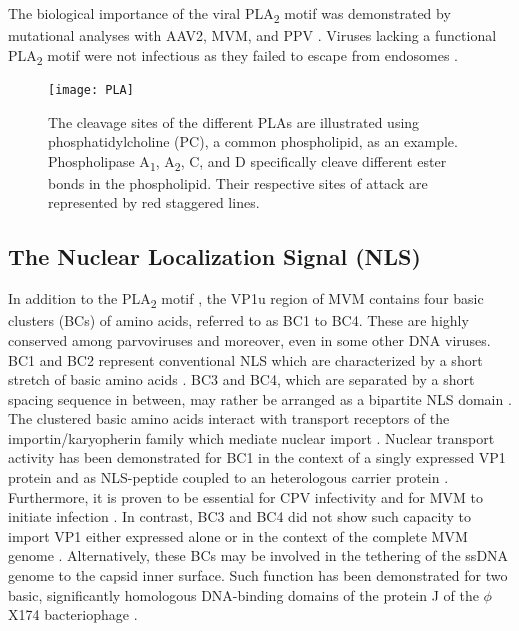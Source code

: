 The biological importance of the viral PLA\textsubscript{2} motif was demonstrated by mutational analyses with AAV2, MVM, and PPV \cite{pmid16284249, pmid11702787, pmid20974479}. Viruses lacking a functional PLA\textsubscript{2} motif were not infectious as they failed to escape from endosomes \cite{pmid16284249, pmid14644609,  pmid11799199, pmid11961250}.               

\begin{figure}[H]
\centering
  \texttt{[image: PLA]}
  \caption[The Cleavage Sites of Different Types of PLAs]
   {The cleavage sites of the different PLAs are illustrated using phosphatidylcholine (PC), a common phospholipid, as an example. Phospholipase A\textsubscript{1}, A\textsubscript{2}, C, and D specifically cleave different ester bonds in the phospholipid. Their respective sites of attack are represented by red staggered lines.} 
\label{PLA}
\end{figure}

\subsection{The Nuclear Localization Signal (NLS)}
\label{NLS1}
In addition to the PLA\textsubscript{2} motif \cite{pmid11702787}, the VP1u region of MVM contains four basic clusters (BCs) of amino acids, referred to as BC1 to BC4. These are highly conserved among parvoviruses and moreover, even in some other DNA viruses. BC1 and BC2 represent conventional NLS which are characterized by a short stretch of basic amino acids \cite{pmid6096007, pmid6088992}. BC3 and BC4, which are separated by a short spacing sequence in between, may rather be arranged as a bipartite NLS domain \cite{pmid1991323}. The clustered basic amino acids interact with transport receptors of the importin/karyopherin family which mediate nuclear import \cite{pmid9126736, pmid9759490, pmid12067655}. Nuclear transport activity has been demonstrated for BC1 in the context of a singly expressed VP1 protein \cite{pmid12072505} and as NLS-peptide coupled to an heterologous carrier protein \cite{pmid9428689}. Furthermore, it is proven to be essential for CPV infectivity \cite{pmid11799183} and for MVM to initiate infection \cite{pmid12072505}. In contrast, BC3 and BC4 did not show such capacity to import VP1 either expressed alone \cite{pmid9428689} or in the context of the complete MVM genome \cite{pmid12072505}. Alternatively, these BCs may be involved in the tethering of the ssDNA genome to the capsid inner surface. Such function has been demonstrated for two basic, significantly homologous DNA-binding domains of the protein J of the $\phi$X174 bacteriophage \cite{pmid11991963}.

